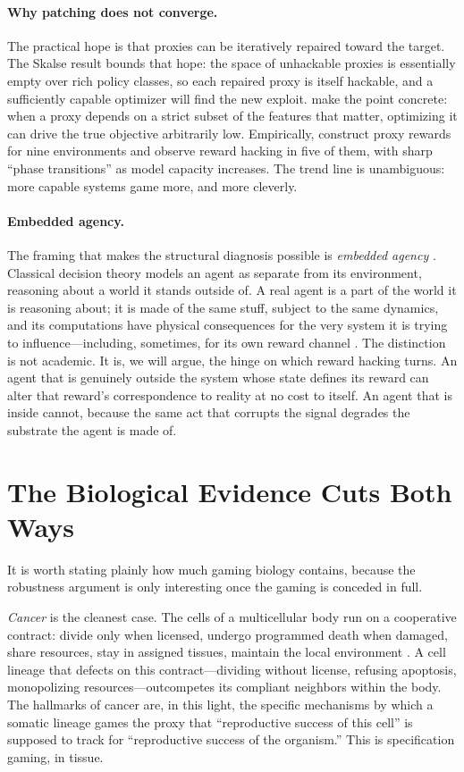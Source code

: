 \documentclass[11pt]{article}
\begin{document}
\paragraph{Why patching does not converge.} The practical hope is that proxies can be iteratively repaired toward the target. The Skalse result bounds that hope: the space of unhackable proxies is essentially empty over rich policy classes, so each repaired proxy is itself hackable, and a sufficiently capable optimizer will find the new exploit. \citet{zhuang2020} make the point concrete: when a proxy depends on a strict subset of the features that matter, optimizing it can drive the true objective arbitrarily low. Empirically, \citet{pan2022} construct proxy rewards for nine environments and observe reward hacking in five of them, with sharp ``phase transitions'' as model capacity increases. The trend line is unambiguous: more capable systems game more, and more cleverly.

\paragraph{Embedded agency.} The framing that makes the structural diagnosis possible is \emph{embedded agency} \citep{demski2019}. Classical decision theory models an agent as separate from its environment, reasoning about a world it stands outside of. A real agent is a part of the world it is reasoning about; it is made of the same stuff, subject to the same dynamics, and its computations have physical consequences for the very system it is trying to influence---including, sometimes, for its own reward channel \citep{everitt2017}. The distinction is not academic. It is, we will argue, the hinge on which reward hacking turns. An agent that is genuinely outside the system whose state defines its reward can alter that reward's correspondence to reality at no cost to itself. An agent that is inside cannot, because the same act that corrupts the signal degrades the substrate the agent is made of.

\section{The Biological Evidence Cuts Both Ways}\label{sec:bio}

It is worth stating plainly how much gaming biology contains, because the robustness argument is only interesting once the gaming is conceded in full.

\emph{Cancer} is the cleanest case. The cells of a multicellular body run on a cooperative contract: divide only when licensed, undergo programmed death when damaged, share resources, stay in assigned tissues, maintain the local environment \citep{aktipis2020}. A cell lineage that defects on this contract---dividing without license, refusing apoptosis, monopolizing resources---outcompetes its compliant neighbors within the body. The hallmarks of cancer \citep{hanahan2000} are, in this light, the specific mechanisms by which a somatic lineage games the proxy that ``reproductive success of this cell'' is supposed to track for ``reproductive success of the organism.'' This is specification gaming, in tissue.
\end{document}
